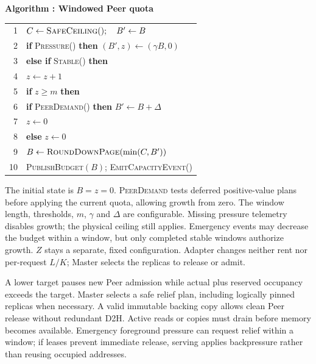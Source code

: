 \par\medskip\noindent\begin{minipage}{\columnwidth}
\raggedright
 \label{alg:adapter}
 \textbf{Algorithm \thedesignalgorithm: Windowed Peer quota}
 \par\smallskip
 \begin{tabularx}{\columnwidth}{@{}r@{\quad}X@{}}
 \toprule
 1 & $C\gets\textsc{SafeCeiling}();\quad B'\gets B$ \\
 2 & \textbf{if} \textsc{Pressure}() \textbf{then} $(B',z)\gets(\gamma B,0)$ \\
 3 & \textbf{else if} \textsc{Stable}() \textbf{then} \\
 4 & \quad $z\gets z+1$ \\
 5 & \quad \textbf{if} $z\ge m$ \textbf{then} \\
 6 & \qquad \textbf{if} \textsc{PeerDemand}() \textbf{then} $B'\gets B+\Delta$ \\
 7 & \qquad $z\gets0$ \\
 8 & \textbf{else} $z\gets0$ \\
 9 & $B\gets\textsc{RoundDownPage}(\min(C,B'))$ \\
 10 & \textsc{PublishBudget}$(B)$; \textsc{EmitCapacityEvent}() \\
 \bottomrule
 \end{tabularx}
\end{minipage}\par\medskip

The initial state is $B=z=0$. \textsc{PeerDemand} tests deferred positive-value
plans before applying the current quota, allowing growth from zero.
The window length, thresholds, $m$, $\gamma$ and $\Delta$ are configurable.
Missing pressure telemetry disables growth; the physical ceiling still
applies. Emergency events may decrease the budget within a window, but
only completed stable windows authorize growth. $Z$ stays a separate,
fixed configuration. Adapter changes neither rent nor per-request $L/K$;
Master selects the replicas to release or admit.

A lower target pauses new Peer admission while actual plus reserved
occupancy exceeds the target. Master selects a safe relief plan, including
logically pinned replicas when necessary. A valid immutable backing copy
allows clean Peer release without redundant D2H. Active reads or copies
must drain before memory becomes available. Emergency foreground pressure
can request relief within a window; if leases prevent immediate release,
serving applies backpressure rather than reusing occupied addresses.


